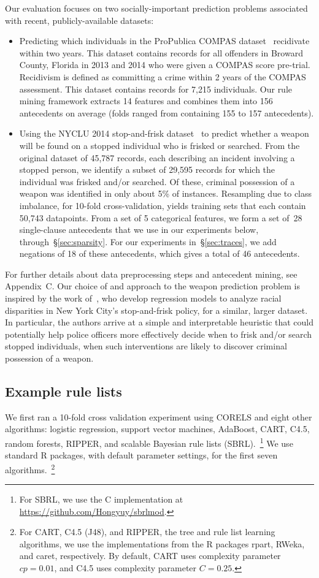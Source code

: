 Our evaluation focuses on two socially-important prediction problems associated
with recent, publicly-available datasets:
\begin{itemize}
\item Predicting which individuals in the ProPublica COMPAS
dataset~\citep{LarsonMaKiAn16} recidivate within two years.
This dataset contains records for all offenders in Broward County, Florida
in 2013 and 2014 who were given a COMPAS score pre-trial.
Recidivism is defined as committing a crime within 2 years of the COMPAS
assessment.
This dataset contains records for 7,215 individuals.
%
Our rule mining framework extracts 14 features and combines them into
156 antecedents on average (folds ranged from containing 155 to 157 antecedents).
%
\item Using the NYCLU 2014 stop-and-frisk dataset~\citep{nyclu:2014} to predict
whether a weapon will be found on a stopped individual who is frisked or searched.
%
From the original dataset of 45,787 records, each describing an incident involving
a stopped person, we identify a subset of 29,595 records for which the individual
was frisked and/or searched.
%
Of these, criminal possession of a weapon was identified in only about 5\% of instances.
%
Resampling due to class imbalance, for 10-fold cross-validation, yields training sets
that each contain 50,743 datapoints.
%
From a set of 5 categorical features, we form a set of~28 single-clause antecedents
that we use in our experiments below, through~\S\ref{sec:sparsity}.
%
For our experiments in~\S\ref{sec:traces}, we add negations of 18 of these antecedents,
which gives a total of 46 antecedents.
\end{itemize}
%
For further details about data preprocessing steps and antecedent mining, see Appendix~C.
%
Our choice of and approach to the weapon prediction problem is inspired by the work
of~\citet{Goel16}, who develop regression models to analyze racial disparities
in New York City's stop-and-frisk policy, for a similar, larger dataset.
%
In particular, the authors arrive at a simple and interpretable heuristic that
could potentially help police officers more effectively decide when to
frisk and/or search stopped individuals, \ie when such
interventions are likely to discover criminal possession of a weapon.

\subsection{Example rule lists}

We first ran a 10-fold cross validation experiment using CORELS
and eight other algorithms:
logistic regression, support vector machines, AdaBoost, CART, C4.5,
random forests, RIPPER, and scalable Bayesian rule lists (SBRL).~\footnote{For
SBRL, we use the C implementation at \url{https://github.com/Hongyuy/sbrlmod}.}
%
We use standard R packages, with default parameter settings,
for the first seven algorithms.~\footnote{For CART, C4.5 (J48), and RIPPER,
\ie the tree and rule list learning algorithms, we use the implementations
from the R packages rpart, RWeka, and caret, respectively.
%
By default, CART uses complexity parameter ${cp = 0.01}$,
and C4.5 uses complexity parameter ${C = 0.25}$.
}

